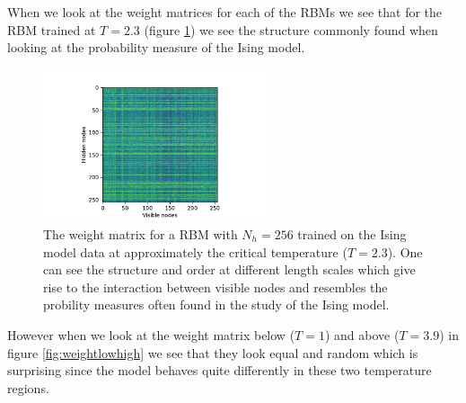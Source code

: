 \documentclass[10 pt, a4paper]{article}
\begin{document}
When we look at the weight matrices for each of the RBMs we see that for the RBM trained at $T = 2.3$ (figure \ref{fig:weightcrit}) we see the structure commonly found when looking at the probability measure of the Ising model. 

\begin{figure}[H]
  \centering
    \includegraphics[width=0.6\textwidth]{weightsCrit}
    \caption{The weight matrix for a RBM with $N_h = 256$ trained on the Ising model data at approximately the critical temperature ($T = 2.3$). One can see the structure and order at different length scales which give rise to the interaction between visible nodes and resembles the probility measures often found in the study of the Ising model. \label{fig:weightcrit}}
\end{figure}

\newpage

However when we look at the weight matrix below ($T = 1$) and above ($T = 3.9$) in figure \ref{fig:weightlowhigh} we see that they look equal and random which is surprising since the model behaves quite differently in these two temperature regions.
\end{document}
